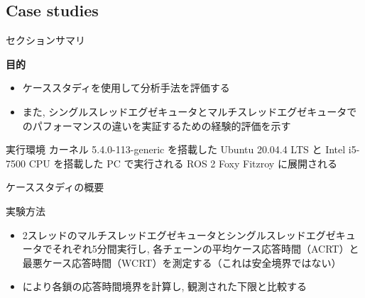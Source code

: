 \subsection{Case studies}
\label{ssec: case studies}

\begin{frame}{セクションサマリ}
    \begin{itembox}[l]{\textbf{目的}}
        \begin{itemize}
            \item ケーススタディを使用して分析手法を評価する
            \item また, シングルスレッドエグゼキュータとマルチスレッドエグゼキュータでのパフォーマンスの違いを実証するための経験的評価を示す
        \end{itemize}
    \end{itembox}
\end{frame}

\begin{frame}{実行環境}
    カーネル 5.4.0-113-generic を搭載した Ubuntu 20.04.4 LTS と Intel i5-7500 CPU を搭載した PC で実行される ROS 2 Foxy Fitzroy に展開される
\end{frame}


\begin{frame}{ケーススタディの概要}
\end{frame}

\begin{frame}{実験方法}
    \begin{itemize}
        \item 2スレッドのマルチスレッドエグゼキュータとシングルスレッドエグゼキュータでそれぞれ5分間実行し, 各チェーンの平均ケース応答時間（ACRT）と最悪ケース応答時間（WCRT）を測定する（これは安全境界ではない）
        \item {} により各鎖の応答時間境界を計算し, 観測された下限と比較する
    \end{itemize}
\end{frame}


